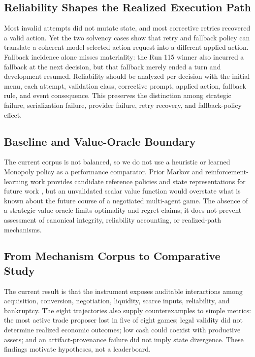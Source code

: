 \documentclass[conference]{IEEEtran}
\begin{document}
\subsection{Reliability Shapes the Realized Execution Path}

Most invalid attempts did not mutate state, and most corrective retries
recovered a valid action. Yet the two solvency cases show that retry and
fallback policy can translate a coherent model-selected action request into a
different applied action.
Fallback incidence alone misses materiality: the Run 115 winner also incurred
a fallback at the next decision, but that fallback merely ended a turn and
development resumed. Reliability should be analyzed per decision with the
initial menu, each attempt, validation class, corrective prompt, applied
action, fallback rule, and event consequence. This preserves the distinction
among strategic failure, serialization failure, provider failure, retry
recovery, and fallback-policy effect.

\subsection{Baseline and Value-Oracle Boundary}

The current corpus is not balanced, so we do not use a heuristic or learned
Monopoly policy as a performance comparator. Prior Markov and
reinforcement-learning work provides candidate reference policies and state
representations for future work
\cite{monopoly_markov,monopoly_rl,monopoly_drl}, but an unvalidated scalar value
function would overstate what is known about the future course of a negotiated
multi-agent game. The absence of a strategic value oracle limits optimality
and regret claims; it does not prevent assessment of canonical integrity,
reliability accounting, or realized-path mechanisms.

\subsection{From Mechanism Corpus to Comparative Study}

The current result is that the instrument exposes auditable interactions
among acquisition, conversion, negotiation, liquidity, scarce inputs,
reliability, and bankruptcy. The eight trajectories also supply
counterexamples to simple metrics: the most active trade proposer lost in five
of eight games; legal validity did not determine realized economic outcomes;
low cash could coexist with productive assets; and an artifact-provenance
failure did not imply state divergence. These findings motivate hypotheses,
not a leaderboard.
\end{document}
